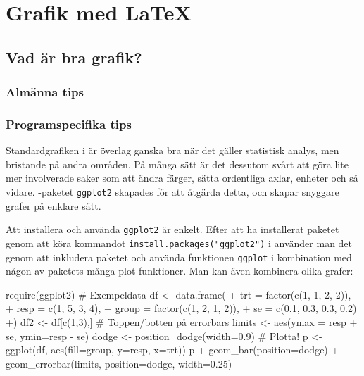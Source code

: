 \documentclass[lang=sv,ptsize=10pt,font=none,nomath,titles=bf,../../a4.tex]{subfiles}
\begin{document}
\section{Grafik med \LaTeX}\label{sec:4}

\subsection{Vad är bra grafik?}
\subsubsection{Almänna tips}
\subsubsection{Programspecifika tips}
\label{sec:ggplot2}
Standardgrafiken i \Rlogo är överlag ganska bra när det gäller statistisk
analys, men bristande på andra områden. På många sätt är det dessutom svårt
att göra lite mer involverade saker som att ändra färger, sätta ordentliga
axlar, enheter och så vidare. \Rlogo-paketet \texttt{ggplot2}
skapades för att åtgärda detta, och skapar snyggare grafer på enklare sätt.


Att installera och använda \texttt{ggplot2} är enkelt. Efter att ha installerat
paketet genom att köra kommandot \verb|install.packages("ggplot2")| i \Rlogo
använder man det genom att inkludera paketet och använda funktionen
\texttt{ggplot} i kombination med någon av paketets många plot-funktioner.
Man kan även kombinera olika grafer:
\begin{rcode}
require(ggplot2)
# Exempeldata
df <- data.frame(
+   trt = factor(c(1, 1, 2, 2)),
+   resp = c(1, 5, 3, 4), 
+   group = factor(c(1, 2, 1, 2)),
+   se = c(0.1, 0.3, 0.3, 0.2)
+) 
df2 <- df[c(1,3),] 
# Toppen/botten på errorbars
limits <- aes(ymax = resp + se, ymin=resp - se)
dodge <- position_dodge(width=0.9)
# Plotta!
p <- ggplot(df, aes(fill=group, y=resp, x=trt))
p + geom_bar(position=dodge) +
  + geom_errorbar(limits, position=dodge, width=0.25)
\end{rcode}
\end{document}
